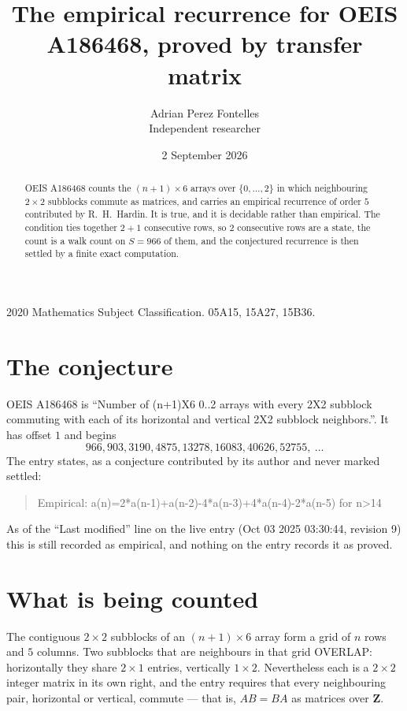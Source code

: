 \documentclass[11pt,a4paper]{article}
\title{The empirical recurrence for OEIS A186468, proved by transfer matrix}
\author{Adrian Perez Fontelles\\ \small Independent researcher}
\date{2 September 2026}
\theoremstyle{plain}
\theoremstyle{definition}
\begin{document}
\maketitle

\begin{abstract}
OEIS A186468 counts the $(n+1)\times6$ arrays over $\{0,\dots,2\}$ in which
neighbouring $2\times2$ subblocks commute as matrices, and carries an empirical recurrence
of order $5$ contributed by R.~H.~Hardin. It is true, and it is decidable rather than
empirical. The condition ties together $2+1$ consecutive rows, so $2$ consecutive rows are
a state, the count is a walk count on $S=966$ of them, and the conjectured recurrence is then
settled by a finite exact computation.
\end{abstract}

\noindent\small 2020 Mathematics Subject Classification. 05A15, 15A27, 15B36.\normalsize

\section{The conjecture}

OEIS A186468 is ``Number of (n+1)X6 0..2 arrays with every 2X2 subblock commuting with each of its horizontal and vertical 2X2 subblock neighbors.''. It has offset $1$ and begins
\[
966, 903, 3190, 4875, 13278, 16083, 40626, 52755,\ \dots
\]
The entry states, as a conjecture contributed by its author and never marked settled:
\begin{quote}
Empirical: a(n)=2*a(n-1)+a(n-2)-4*a(n-3)+4*a(n-4)-2*a(n-5) for n>14
\end{quote}
As of the ``Last modified'' line on the live entry (Oct 03 2025 03:30:44, revision 9) this is still
recorded as empirical, and nothing on the entry records it as proved.

\section{What is being counted}

The contiguous $2\times2$ subblocks of an $(n+1)\times6$ array form a grid of $n$
rows and $5$ columns. Two subblocks that are neighbours in that
grid OVERLAP: horizontally they share $2\times1$ entries, vertically
$1\times2$. Nevertheless each is a $2\times2$ integer matrix in its own right, and
the entry requires that every neighbouring pair, horizontal or vertical, commute --- that is,
$AB=BA$ as matrices over $\mathbf{Z}$.
\end{document}
